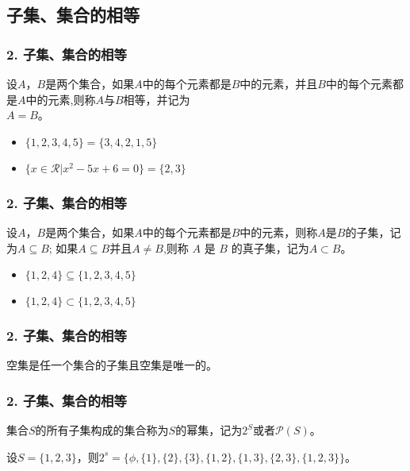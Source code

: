 \documentclass{beamer}
\begin{document}
\begin{CJK*}{UTF8}{gbsn}
\section{子集、集合的相等}
\begin{frame}
  \frametitle{2. 子集、集合的相等}

  \begin{Def}
    设$A$，$B$是两个集合，如果$A$中的每个元素都是$B$中的元素，并且$B$中的每个元素都是$A$中的元素,则称$A$与$B$\alert{相等}，并记为\\ $A=B$。
  \end{Def}
  \begin{itemize}
\pause
  \item   $\{1,2,3,4,5\} = \{3,4,2,1,5\}$
\pause
\item $\{x \in \mathcal{R} | x^2 -5x + 6 = 0\} = \{2,3\}$
  \end{itemize}
\end{frame}
\begin{frame}
  \frametitle{2. 子集、集合的相等}
  \begin{Def}
设$A$，$B$是两个集合，如果$A$中的每个元素都是$B$中的元素，则称$A$是$B$的\alert{子集}，记为$A \subseteq B$; 如果$A \subseteq B$并且$A \neq B$,则称 $A$ 是 $B$ 的\alert{真子集}，记为$A\subset B$。    
  \end{Def}
  \begin{itemize}
\pause
  \item   $\{1,2,4\} \subseteq \{1,2,3,4,5\}$
\pause
\item $\{1,2,4\} \subset \{1,2,3,4,5\}$
  \end{itemize}
\end{frame}
\begin{frame}
  \frametitle{2. 子集、集合的相等}
  \begin{Thm}
   空集是任一个集合的子集且空集是唯一的。 
  \end{Thm}
\end{frame}
\begin{frame}
  \frametitle{2. 子集、集合的相等}

\begin{Def}
  集合$S$的所有子集构成的集合称为$S$的幂集，记为$2^S$或者$\mathcal{P}(S)$。
\end{Def}\pause
\begin{Ex}
  设$S=\{1,2,3\}$，则$2^s=\{\phi, \{1\},\{2\},\{3\},\{1,2\},\{1,3\},\{2,3\},\{1,2,3\}\}$。
\end{Ex}
\end{frame}

\end{CJK*}
\end{document}
